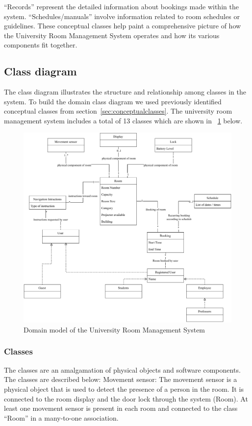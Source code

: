 \documentclass[conference,onecolumn]{IEEEtran}
\begin{document}
	``Records'' represent the detailed information about bookings made within the system. ``Schedules/manuals'' involve information related to room schedules or guidelines. These conceptual classes help paint a comprehensive picture of how the University Room Management System operates and how its various components fit together.

\subsection{Class diagram}
	The class diagram illustrates the structure and relationship among classes in the system. To build the domain class diagram we used previously identified conceptual classes from section~\ref{sec:conceptualclasses}. The university room management system includes a total of 13 classes which are shown in \figurename~\ref{fig:classdiagram} below.

	\begin{figure}[H]
		\centering
		\includegraphics[width=1\textwidth]{Figures/DomainModel.pdf}
		\caption{Domain model of the University Room Management System}
		\label{fig:classdiagram}
	\end{figure}

	\subsubsection*{Classes} \label{sec:classes}
		The classes are an amalgamation of physical objects and software components. The classes are described below:
		Movement sensor: The movement sensor is a physical object that is used to detect the presence of a person in the room. It is connected to the room display and the door lock through the system (Room). At least one movement sensor is present in each room and connected to the class ``Room'' in a many-to-one association.
		
\end{document}
